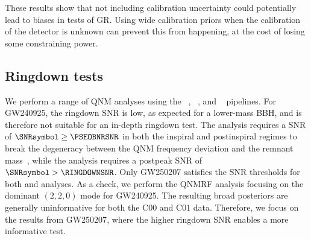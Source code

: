 These results show that not including calibration uncertainty could potentially lead to biases in tests of \ac{GR}.
Using wide calibration priors when the calibration of the detector is unknown can prevent this from happening, at the cost of losing some constraining power.

\subsection{Ringdown tests}
We perform a range of \ac{QNM} analyses using the \RINGDOWN{}~\cite{Isi:2019aib,Isi:2021iql,Siegel:2024jqd}, ~\cite{Ma:2022wpv,Ma:2023vvr,Ma:2023cwe,Lu:2025mwp}, and \PSEOBNR{}~\cite{Brito:2018rfr,Ghosh:2021mrv,Maggio:2022hre,Pompili:2025cdc} pipelines.
For \ac{GW240925}, the ringdown \ac{SNR} is low, as expected for a lower-mass \ac{BBH}, and is therefore not suitable for an in-depth ringdown test.
The \PSEOBNR{} analysis requires a \ac{SNR} of $\SNRsymbol \geq \PSEOBNRSNR$ in both the inspiral and postinspiral regimes to break the degeneracy between the \ac{QNM} frequency deviation and the remnant mass~\cite{Ghosh:2021mrv}, while the \RINGDOWN{} analysis requires a postpeak \ac{SNR}  of $\SNRsymbol > \RINGDOWNSNR$.
Only \ac{GW250207} satisfies the \ac{SNR} thresholds for both \PSEOBNR{} and \RINGDOWN{} analyses.
As a check, we perform the \ac{QNMRF} analysis focusing on the dominant $(2,2,0)$ mode for \ac{GW240925}.
The resulting broad posteriors are generally uninformative for both the \ac{C00} and \ac{C01} data.
Therefore, we focus on the results from \ac{GW250207}, where the higher ringdown \ac{SNR} enables a more informative test.

